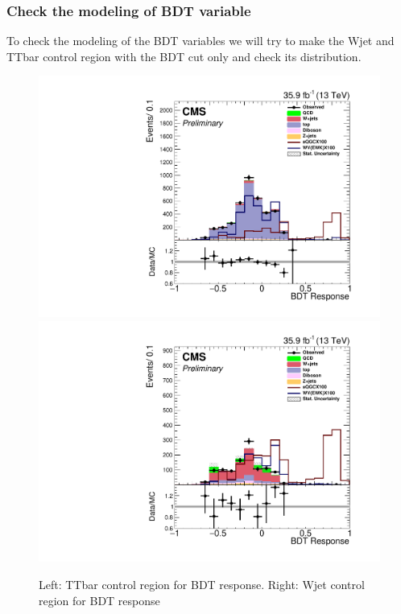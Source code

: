 \subsubsection{Check the modeling of BDT variable}
To check the modeling of the BDT variables we will try to make the Wjet and TTbar control region with the BDT cut only and check its distribution.
\begin{figure}[ht!] 
	 \centering
	 \includegraphics[scale=0.38]{Plots/ControlPlots/BDT/DibosonBoostedElMuCuts13TeV_TTBarControlRegion_CHS_BDT_response.pdf}%
	 \includegraphics[scale=0.38]{Plots/ControlPlots/BDT/DibosonBoostedElMuCuts13TeV_WjetControlRegion_Tighter_CHS_BDT_response.pdf}
	 \caption{Left: TTbar control region for BDT response. Right: Wjet control region for BDT response}
	 \label{fig:BDT_response_modeling}
\end{figure}

